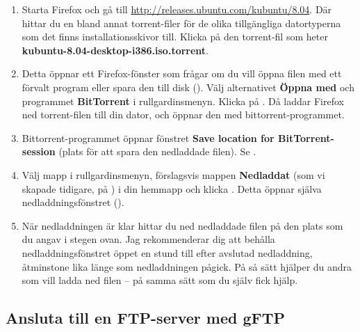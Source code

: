 \documentclass[a4paper,final]{memoir} %
\newcommand\xubuntuver{8.04}
\begin{document}
\begin{enumerate}

\item Starta Firefox och gå till \url{http://releases.ubuntu.com/kubuntu/\xubuntuver}. Där hittar du en bland annat torrent-filer för de olika tillgängliga datortyperna som det finns installationsskivor till. Klicka på den torrent-fil som heter \textbf{kubuntu-\xubuntuver-desktop-i386.iso.torrent}. 
\item Detta öppnar ett Firefox-fönster som frågar om du vill öppna filen med ett förvalt program eller spara den till disk (). Välj alternativet \textbf{Öppna med} och programmet \textbf{BitTorrent} i rullgardinsmenyn. Klicka på \xok{}. Då laddar Firefox ned torrent-filen till din dator, och öppnar den med bittorrent-programmet.
\item Bittorrent-programmet öppnar fönstret \textbf{Save location for BitTorrent-session} (plats för att spara den nedladdade filen). Se . 
\item Välj mapp i rullgardinsmenyn, förslagsvis mappen \textbf{Nedladdat} (som vi skapade tidigare, på ) i din hemmapp och klicka \xok{}. Detta öppnar själva nedladdningsfönstret ().
\item När nedladdningen är klar hittar du ned nedladdade filen på den plats som du angav i stegen ovan. Jag rekommenderar dig att behålla nedladdningsfönstret öppet en stund till efter avslutad nedladdning, åtminstone lika länge som nedladdningen pågick. På så sätt hjälper du andra som vill ladda ned filen -- på samma sätt som du själv fick hjälp.

\end{enumerate}





\subsection{Ansluta till en FTP-server med gFTP}\label{gFTP}
\end{document}
